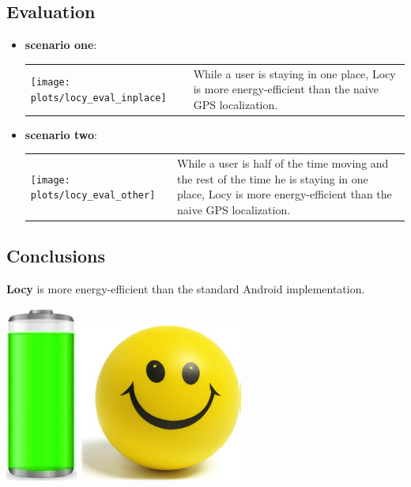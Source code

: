 \documentclass[a2,landscape]{a0poster}
\begin{document}
\mbox{}\framebreak
\begin{center}
\section*{Evaluation}
\end{center}
\begin{itemize}
   \item \textbf{scenario one}:

\begin{tabular}[t]{p{8.0cm} p{8.0cm}}
       \vspace{0cm}\texttt{[image: plots/locy\_eval\_inplace]} &  \vspace{0cm}While a user is staying in one place, Locy is more energy-efficient than the naive GPS localization.
      \end{tabular}
\vspace{0.3cm}
   \item \textbf{scenario two}:

\begin{tabular}[t]{p{8.0cm} p{8.0cm}}
	\vspace{0cm}\texttt{[image: plots/locy\_eval\_other]} &  \vspace{0cm}While a user is half of the time moving and the rest of the time he is staying in one place, Locy is more energy-efficient than the naive GPS localization.
\end{tabular}
  \end{itemize}

\begin{center}
\section*{Conclusions}
\end{center}

\textbf{Locy} is more energy-efficient than the standard Android implementation. 
\vspace{2.6cm}
\begin{center}
\includegraphics[scale=0.7]{plots/full_battery}
\includegraphics[scale=0.7]{plots/happy_face}
\end{center}
\end{document}
